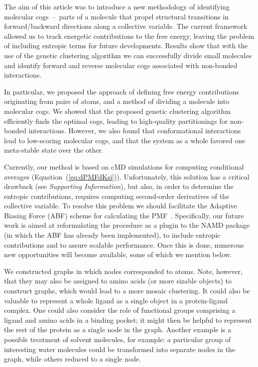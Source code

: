 {\color{black}
The aim of this article was to introduce a new methodology of identifying molecular cogs~--~parts of a molecule that propel structural transitions in forward/backward directions along a collective variable.
The current framework allowed us to track energetic contributions to the free energy, leaving the problem of including entropic terms for future developments.
Results show that with the use of the genetic clustering algorithm we can successfully divide small molecules and identify forward and reverse molecular cogs associated with non-bonded interactions.}

In particular, we proposed the approach of defining free energy contributions originating from pairs of atoms, and a method of dividing a molecule into molecular cogs.
We showed that the proposed genetic clustering algorithm efficiently finds the optimal cogs, leading to high-quality partitionings for non-bonded interactions.
However, we also found that conformational interactions lead to low-scoring molecular cogs, and that the system as a whole favored one meta-stable state over the other.

Currently, our method is based on {\color{black}cMD} simulations for computing conditional averages (Equation~(\ref{eq:dPMFdKsi})).
Unfortunately, this solution has a critical drawback (see \emph{Supporting Information}), but also, in order to determine the entropic contributions, requires computing second-order derivatives of the collective variable.
To resolve this problem we should facilitate the Adaptive Biasing Force (ABF) scheme for calculating the PMF~\cite{comer2014adaptive}.
{\color{black}Specifically, our future work is aimed at reformulating the procedure as a plugin to the NAMD package (in which the ABF has already been implemented), to include entropic contributions and to assure scalable performance.
Once this is done, numerous new opportunities will become available, some of which we mention below.}

We constructed graphs in which nodes corresponded to atoms.
Note, however, that they may also be assigned to amino acids (or more sizable objects) to construct graphs, which would lead to a more mosaic clustering.
It could also be valuable to represent a whole ligand as a single object in a protein-ligand complex.
One could also consider the role of functional groups comprising a ligand and amino acids in a binding pocket; it might then be helpful to represent the rest of the protein as a single node in the graph.
{\color{black}Another example is a possible treatment of solvent molecules, for example: a particular group of interesting water molecules could be transformed into separate nodes in the graph, while others reduced to a single node.}

